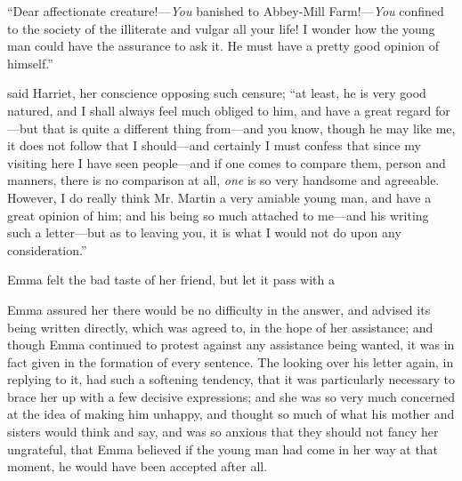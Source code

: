 

“Dear affectionate creature!---{\em You} banished to Abbey-Mill Farm!---{\em You} confined to the society of the illiterate and vulgar all your life! I wonder how the young man could have the assurance to ask it. He must have a pretty good opinion of himself.”

 said Harriet, her conscience opposing such censure; “at least, he is very good natured, and I shall always feel much obliged to him, and have a great regard for---but that is quite a different thing from---and you know, though he may like me, it does not follow that I should---and certainly I must confess that since my visiting here I have seen people---and if one comes to compare them, person and manners, there is no comparison at all, {\em one} is so very handsome and agreeable. However, I do really think Mr. Martin a very amiable young man, and have a great opinion of him; and his being so much attached to me---and his writing such a letter---but as to leaving you, it is what I would not do upon any consideration.”



Emma felt the bad taste of her friend, but let it pass with a 


Emma assured her there would be no difficulty in the answer, and advised its being written directly, which was agreed to, in the hope of her assistance; and though Emma continued to protest against any assistance being wanted, it was in fact given in the formation of every sentence. The looking over his letter again, in replying to it, had such a softening tendency, that it was particularly necessary to brace her up with a few decisive expressions; and she was so very much concerned at the idea of making him unhappy, and thought so much of what his mother and sisters would think and say, and was so anxious that they should not fancy her ungrateful, that Emma believed if the young man had come in her way at that moment, he would have been accepted after all.

